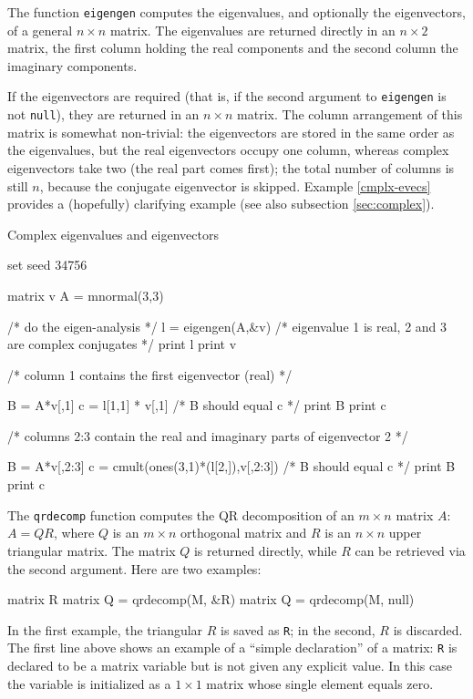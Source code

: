 The function \texttt{eigengen} computes the eigenvalues, and
optionally the eigenvectors, of a general $n \times n$ matrix.  The
eigenvalues are returned directly in an $n \times 2$ matrix, the first
column holding the real components and the second column the imaginary
components.  

If the eigenvectors are required (that is, if the second argument to
\texttt{eigengen} is not \texttt{null}), they are returned in an $n
\times n$ matrix. The column arrangement of this matrix is somewhat
non-trivial: the eigenvectors are stored in the same order as the
eigenvalues, but the real eigenvectors occupy one column, whereas
complex eigenvectors take two (the real part comes first); the total
number of columns is still $n$, because the conjugate eigenvector is
skipped. Example \ref{cmplx-evecs} provides a (hopefully) clarifying
example (see also subsection \ref{sec:complex}).

\begin{script}[htbp]
  \caption{Complex eigenvalues and eigenvectors}
  \label{cmplx-evecs}
\begin{scode}
set seed 34756

matrix v
A = mnormal(3,3)

/* do the eigen-analysis */
l = eigengen(A,&v)
/* eigenvalue 1 is real, 2 and 3 are complex conjugates */
print l
print v

/* 
  column 1 contains the first eigenvector (real)
*/

B = A*v[,1]
c = l[1,1] * v[,1]
/* B should equal c */
print B
print c


/* 
  columns 2:3 contain the real and imaginary parts
  of eigenvector 2
*/

B = A*v[,2:3]
c = cmult(ones(3,1)*(l[2,]),v[,2:3])
/* B should equal c */
print B
print c
\end{scode}
\end{script}

The \texttt{qrdecomp} function computes the QR decomposition of an $m
\times n$ matrix $A$: $A = QR$, where $Q$ is an $m \times n$
orthogonal matrix and $R$ is an $n \times n$ upper triangular matrix.
The matrix $Q$ is returned directly, while $R$ can be retrieved via
the second argument.  Here are two examples:
%
\begin{code}
matrix R
matrix Q = qrdecomp(M, &R)
matrix Q = qrdecomp(M, null)
\end{code}
%
In the first example, the triangular $R$ is saved as \texttt{R}; in
the second, $R$ is discarded.  The first line above shows an example
of a ``simple declaration'' of a matrix: \texttt{R} is
declared to be a matrix variable but is not given any explicit value.
In this case the variable is initialized as a $1\times 1$ matrix whose
single element equals zero.


